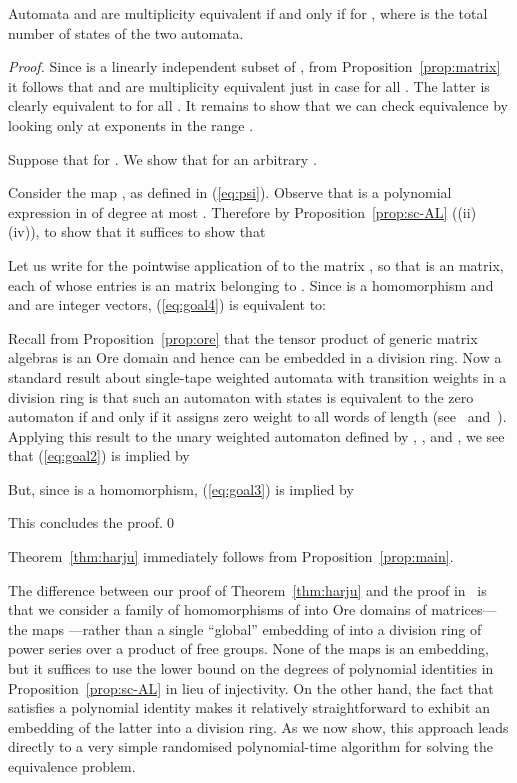 \documentclass[runningheads]{llncs}
\begin{document}
\begin{proposition}
  Automata  and  are multiplicity equivalent if and only if
   for , where  is the
  total number of states of the two automata.
\label{prop:main}
\end{proposition}
\begin{proof}
Since  is a linearly independent subset of , from Proposition~\ref{prop:matrix} it
follows that  and  are multiplicity equivalent just in case
 for all .  The latter is clearly equivalent to  for all .  It remains to show that we can check
equivalence by looking only at exponents  in the range
.

Suppose that  for .  We show
that  for an arbitrary .

Consider the map , as
defined in (\ref{eq:psi}).  Observe that  is a
polynomial expression in  of degree at
most .  Therefore by Proposition~\ref{prop:sc-AL} ((ii)
 (iv)), to show that  it
suffices to show that

Let us write  for the pointwise application of 
to the matrix , so that 
is an  matrix, each of whose entries is an 
matrix belonging to
.  Since  is a homomorphism
and  and  are integer vectors,
(\ref{eq:goal4}) is equivalent to:


Recall from Proposition~\ref{prop:ore} that the tensor product of
generic matrix algebras  is an Ore domain and hence can be
embedded in a division ring.  Now a standard result about single-tape
weighted automata with transition weights in a division ring is that
such an automaton with  states is equivalent to the zero automaton
if and only if it assigns zero weight to all words of length 
(see~\cite[pp143--145]{Eilenberg74} and~\cite{Schutzenberger61}).
Applying this result to the unary weighted automaton defined by
, , and , we see that (\ref{eq:goal2}) is implied
by

But, since  is a homomorphism, (\ref{eq:goal3}) is implied by 

This concludes the proof.\qed
\end{proof}
Theorem~\ref{thm:harju} immediately follows from
Proposition~\ref{prop:main}.  

\begin{remark}
  The difference between our proof of Theorem~\ref{thm:harju} and the
  proof in~\cite{HarjuK91} is that we consider a family of
  homomorphisms of  into Ore
  domains of matrices---the maps ---rather than a single
  ``global'' embedding of  into
  a division ring of power series over a product of free groups.  None
  of the maps  is an embedding, but it suffices to use the
  lower bound on the degrees of polynomial identities in
  Proposition~\ref{prop:sc-AL} in lieu of injectivity.  On the other
  hand, the fact that  satisfies a polynomial identity
  makes it relatively straightforward to exhibit an embedding of the
  latter into a division ring.  As we now show, this approach leads
  directly to a very simple randomised polynomial-time algorithm for
  solving the equivalence problem.
\label{rem:difference}
\end{remark}
\end{document}
